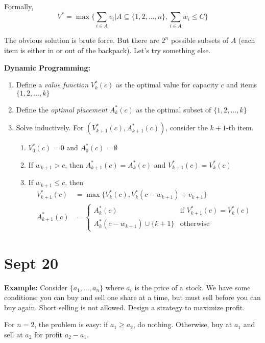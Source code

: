 \documentclass[12pt]{article}
\newcommand{\sub}{\subseteq}
\begin{document}
\begin{center}
    Formally, 
    \[V^* = \max \{\sum_{i \in A} v_i \big\vert A \sub \{1, 2, \dots, n\}, \sum_{i \in A} w_i \leq C\}\]

    The obvious solution is brute force. But there are $2^n$ possible subsets of $A$ (each item is either in or out of the backpack). Let's try something else. 
    
    \textbf{Dynamic Programming:}
    \begin{enumerate}
        \item Define a \emph{value function} $V_k^*(c)$ as the optimal value for capacity $c$ and items $\{1, 2, \dots, k\}$
        \item Define the \emph{optimal placement} $A^*_k(c)$ as the optimal subset of $\{1, 2, \dots, k\}$
        \item Solve inductively. For $(V_{k+1}^*(c), A_{k+1}^*(c))$, consider the $k+1$-th item.
        \begin{enumerate}[label = (\alph*)]
            \item $V_0^*(c) = 0$ and $A_0^*(c) = \emptyset$ 
            \item If $w_{k+1} > c$, then $A_{k+1}^*(c) = A_k^*(c)$ and $V_{k+1}^*(c) = V_k^*(c)$
            \item If $w_{k+1} \leq c$, then 
            \begin{align*}
                V_{k+1}^*(c) &= \max\{V_k^*(c), V_k^*(c - w_{k+1}) + v_{k+1}\}\\
                A_{k+1}^*(c) &= \begin{cases}
                    A_k^*(c) & \text{if } V_{k+1}^*(c) = V_k^*(c)\\ 
                    A_k^*(c - w_{k+1}) \cup \{k+1\} & \text{otherwise}
                \end{cases}
            \end{align*}
        \end{enumerate}
    \end{enumerate}

\section{Sept 20}
    \textbf{Example:} Consider $\{a_1, \dots, a_n\}$ where $a_i$ is the price of a stock. We have some conditions: you can buy and sell one share at a time, but must sell before you can buy again. Short selling is not allowed. Design a strategy to maximize profit.
    
    For $n = 2$, the problem is easy: if $a_1 \geq a_2$, do nothing. Otherwise, buy at $a_1$ and sell at $a_2$ for profit $a_2 - a_1$. 


\end{center}
\end{document}
